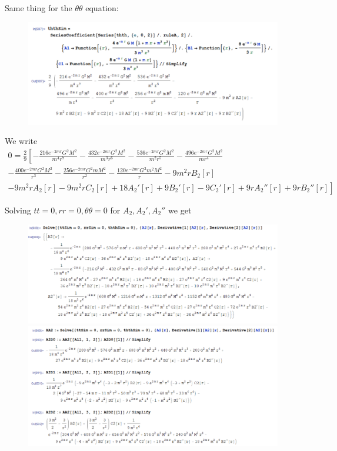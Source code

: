\documentclass{book}
\theoremstyle{definition}
\newcommand{\nn}{\nonumber}
\newcommand{\f}[2]{\frac{#1}{#2}}
\newcommand{\lb}{\left[}
\newcommand{\rb}{\right]}
\begin{document}
Same thing for the $\theta\theta$ equation:
\begin{figure}[!htb]
	\centering
	\includegraphics[scale=0.25]{thth2Sim}
\end{figure}
We write
\begin{align}
0 = \f{2}{9} \lb -\f{216e^{-2mr}G^2M^2}{m^4 r^7} 
-\f{432e^{-2mr}G^2M^2}{m^3 r^6}
-\f{536 e^{-2mr}G^2M^2}{m^2 r^5}
-\f{496 e^{-2mr}G^2M^2}{m r^4}  \right. \nn\\
\left. - \f{400 e^{-2 m r} G^2 M^2}{r^3} 
- \f{256 e^{-2 m r}G^2 m M^2}{r^2} 
- \f{120 e^{-2 m r} G^2 m^2 M^2}{r} - 9 m^2 r B_2[r] 
\right. \nn\\
\left. - 9 m^2 r A_2[r] - 9 m^2 r C_2[r] + 18 A_2'[r] + 9 B_2'[r] - 9 C_2'[r] + 9 r A_2''[r] + 9r B_2''[r] \rb 
\end{align}

Solving $tt=0, rr=0, \theta\theta = 0$ for $A_2, A_2', A_2''$ we get
\begin{figure}[!htb]
	\centering
	\includegraphics[scale=0.25]{A2}
	\includegraphics[scale=0.25]{A2bis}
\end{figure}\\
\end{document}
